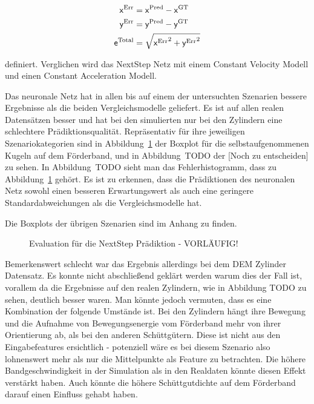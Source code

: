 \begin{align*}
    \mathsf{x}{^{\text{Err}}} &=  \mathsf{x}{^{\text{Pred}}} -  \mathsf{x}{^{\text{GT}}} \\
    \mathsf{y}{^{\text{Err}}} &=  \mathsf{y}{^{\text{Pred}}} -  \mathsf{y}{^{\text{GT}}} \\
    \mathsf{e}{^{\text{Total}}} &= \sqrt{ \mathsf{x}{^{\text{Err}}}^2 +  \mathsf{y}{^{\text{Err}}}^2}
\end{align*}

definiert. Verglichen wird das NextStep Netz mit einem Constant Velocity Modell und einen Constant Acceleration Modell.

Das neuronale Netz hat in allen bis auf einem der untersuchten Szenarien bessere Ergebnisse als die beiden Vergleichsmodelle geliefert.
Es ist auf allen realen Datensätzen besser und hat bei den simulierten nur bei den Zylindern eine schlechtere Prädiktionsqualität.
Repräsentativ für ihre jeweiligen Szenariokategorien sind in Abbildung~\ref{fig:boxplotErrorNNnextStep} der Boxplot für die selbstaufgenommenen Kugeln auf dem Förderband,
und in Abbildung~TODO der [Noch zu entscheiden] zu sehen.
In Abbildung~TODO sieht man das Fehlerhistogramm, dass zu Abbildung~\ref{fig:boxplotErrorNNnextStep} gehört.
Es ist zu erkennen, dass die Prädiktionen des neuronalen Netz sowohl einen besseren Erwartungswert als auch eine geringere Standardabweichungen als die Vergleichsmodelle hat.


Die Boxplots der übrigen Szenarien sind im Anhang zu finden.



\begin{figure}[h]
    \centering
	\caption{Evaluation für die NextStep Prädiktion - VORLÄUFIG!}
	\label{fig:boxplotErrorNNnextStep}
\end{figure}



Bemerkenswert schlecht war das Ergebnis allerdings bei dem DEM Zylinder Datensatz.
Es konnte nicht abschließend geklärt werden warum dies der Fall ist, vorallem da die Ergebnisse auf den realen Zylindern, wie in Abbildung TODO zu sehen, deutlich besser waren. 
Man könnte jedoch vermuten, dass es eine Kombination der folgende Umstände ist.
Bei den Zylindern hängt ihre Bewegung und die Aufnahme von Bewegungsenergie vom Förderband mehr von ihrer Orientierung ab, als bei den anderen Schüttgütern.
Diese ist nicht aus den Eingabefeatures ersichtlich - potenziell wäre es bei diesem Szenario also lohnenswert mehr als nur die Mittelpunkte als Feature zu betrachten.
Die höhere Bandgeschwindigkeit in der Simulation als in den Realdaten könnte diesen Effekt verstärkt haben.
Auch könnte die höhere Schüttgutdichte auf dem Förderband darauf einen Einfluss gehabt haben.



